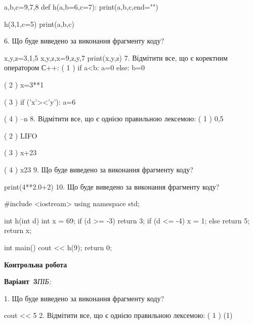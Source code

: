 \documentclass[11pt]{article}
\begin{document}
a,b,c=9,7,8
def h(a,b=6,c=7):
    print(a,b,c,end="")

h(3,1,c=5)
print(a,b,c)

\vspace{5mm}
6. Що буде виведено за виконання фрагменту коду?

x,y,z=3,1,5
x,y,z,x=9,z,y,7
print(x,y,z)
\vspace{5mm}
7. %
Відмітити все, що є коректним оператором С++:
( 1 ) if a<b: a=0 else: b=0

( 2 ) x=3**1

( 3 ) if ('x'><'y'): a=6

( 4 ) --n
\vspace{5mm}
8. %
Відмітити все, що є однією правильною лексемою:
( 1 ) 0,5

( 2 ) LIFO

( 3 ) x+23

( 4 ) x23
\vspace{5mm}
9. Що буде виведено за виконання фрагменту коду?

print(4**2.0+2)
\vspace{5mm}
10. Що буде виведено за виконання фрагменту коду?

#include <iostream>
using namespace std;

int h(int d){
    int x = 69;
    if (d >= -3) 
        return 3;
    if (d <= -4)
         x = 1;
    else
         return 5;
    return x;
}

int main(){
    cout << h(9);
    return 0;
}

\vspace{5mm}










\newpage

\newpage

{\large\textbf{Контрольна робота}}

\textbf{Варіант \No\,3}\hfill \textit{ПІБ:}\,\underline{\hspace{60mm}}
\vspace{4mm}

1. Що буде виведено за виконання фрагменту коду?

cout << 5 %
\vspace{5mm}
2. %
Відмітити все, що є однією правильною лексемою:
( 1 ) (1)
\end{document}
